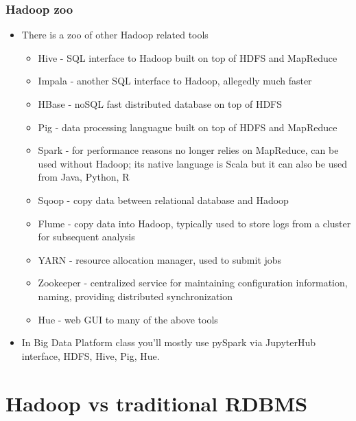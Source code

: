 \documentclass{beamer}
\begin{document}
\begin{frame}
  \frametitle{Hadoop zoo}
  \begin{itemize}
  \item There is a zoo of other Hadoop related tools
    \begin{itemize}
    \item {\color{mycolordef}Hive} - SQL interface to Hadoop built on top of HDFS and MapReduce
    \item {\color{mycolordef}Impala} - another SQL interface to Hadoop, allegedly much faster
    \item {\color{mycolordef}HBase} - noSQL fast distributed database on top of HDFS
    \item {\color{mycolordef}Pig}  -  data processing languague built on top of HDFS and MapReduce
    \item {\color{mycolordef}Spark} - for performance reasons no longer relies on MapReduce,
      can be used without Hadoop; its native language is Scala but it can also be used from Java, Python, R
    \item {\color{mycolordef}Sqoop} - copy data between relational database and Hadoop
    \item {\color{mycolordef}Flume} - copy data into Hadoop, typically used to store logs from a cluster for subsequent analysis
    \item {\color{mycolordef}YARN} - resource allocation manager, used to submit jobs
    \item {\color{mycolordef}Zookeeper} - centralized service for maintaining configuration information, naming, providing distributed synchronization
    \item {\color{mycolordef}Hue} - web GUI to many of the above tools
    \end{itemize}
  \item In Big Data Platform class you'll mostly use pySpark via JupyterHub interface, HDFS, Hive, Pig, Hue.
  \end{itemize}
\end{frame}

\section{Hadoop vs traditional RDBMS}
\end{document}
